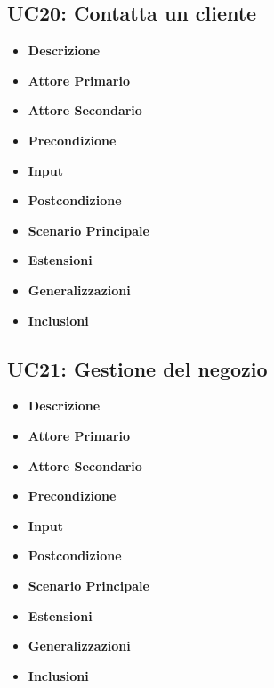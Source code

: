         \subsection{UC20: Contatta un cliente}
        \begin{itemize}
            \item \textbf{Descrizione}
            \item \textbf{Attore Primario}
            \item \textbf{Attore Secondario}
            \item \textbf{Precondizione}
            \item \textbf{Input}
            \item \textbf{Postcondizione}
            \item \textbf{Scenario Principale}
            \item \textbf{Estensioni}
            \item \textbf{Generalizzazioni}
            \item \textbf{Inclusioni}
        \end{itemize}
        \subsection{UC21: Gestione del negozio}
        \begin{itemize}
            \item \textbf{Descrizione}
            \item \textbf{Attore Primario}
            \item \textbf{Attore Secondario}
            \item \textbf{Precondizione}
            \item \textbf{Input}
            \item \textbf{Postcondizione}
            \item \textbf{Scenario Principale}
            \item \textbf{Estensioni}
            \item \textbf{Generalizzazioni}
            \item \textbf{Inclusioni}
        \end{itemize}
